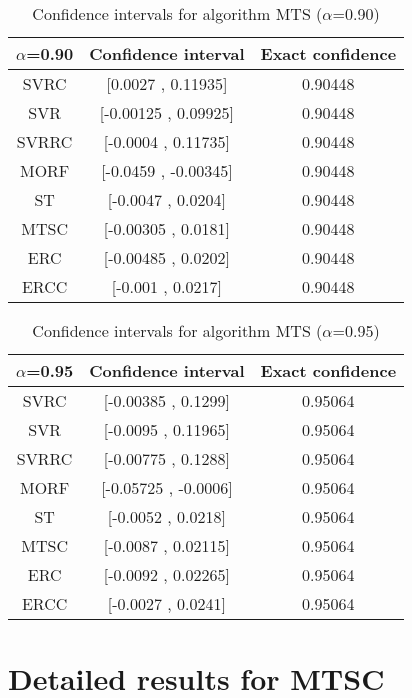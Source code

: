 \documentclass[a4paper,10pt]{article}
\begin{document}
\begin{table}[!htp]
\centering\small
\begin{tabular}{
|c|c|c|}
\hline
 $\alpha$=0.90 & Confidence interval & Exact confidence \\ \hline 
SVRC & [0.0027 , 0.11935] & 0.90448\\ \hline 
SVR & [-0.00125 , 0.09925] & 0.90448\\ \hline 
SVRRC & [-0.0004 , 0.11735] & 0.90448\\ \hline 
MORF & [-0.0459 , -0.00345] & 0.90448\\ \hline 
ST & [-0.0047 , 0.0204] & 0.90448\\ \hline 
MTSC & [-0.00305 , 0.0181] & 0.90448\\ \hline 
ERC & [-0.00485 , 0.0202] & 0.90448\\ \hline 
ERCC & [-0.001 , 0.0217] & 0.90448\\ \hline 

\end{tabular}
\caption{Confidence intervals for algorithm MTS ($\alpha$=0.90)}
\end{table}
\begin{table}[!htp]
\centering\small
\begin{tabular}{
|c|c|c|}
\hline
 $\alpha$=0.95 & Confidence interval & Exact confidence \\ \hline 
SVRC & [-0.00385 , 0.1299] & 0.95064\\ \hline 
SVR & [-0.0095 , 0.11965] & 0.95064\\ \hline 
SVRRC & [-0.00775 , 0.1288] & 0.95064\\ \hline 
MORF & [-0.05725 , -0.0006] & 0.95064\\ \hline 
ST & [-0.0052 , 0.0218] & 0.95064\\ \hline 
MTSC & [-0.0087 , 0.02115] & 0.95064\\ \hline 
ERC & [-0.0092 , 0.02265] & 0.95064\\ \hline 
ERCC & [-0.0027 , 0.0241] & 0.95064\\ \hline 

\end{tabular}
\caption{Confidence intervals for algorithm MTS ($\alpha$=0.95)}
\end{table}

 \clearpage 


\section{Detailed results for MTSC}
\end{document}
